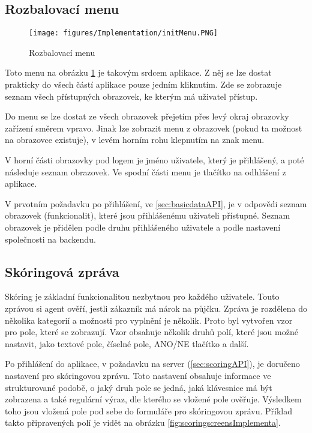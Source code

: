 \documentclass[11pt,twoside,a4paper]{book}
\begin{document}
\subsection{Rozbalovací menu} \label{sec:rolmenu}
\begin{figure}[hb]
\begin{center}
\texttt{[image: figures/Implementation/initMenu.PNG]}
\caption{Rozbalovací menu}
\label{fig:menuscreens}
\end{center}
\end{figure}

Toto menu na obrázku \ref{fig:menuscreens} je takovým srdcem aplikace. Z něj se lze dostat prakticky do všech částí aplikace pouze jedním kliknutím. Zde se zobrazuje seznam všech přístupných obrazovek, ke kterým má uživatel přístup. 

Do menu se lze dostat ze všech obrazovek přejetím přes levý okraj obrazovky zařízení směrem vpravo. Jinak lze zobrazit menu z obrazovek (pokud ta možnost na obrazovce existuje), v levém horním rohu klepnutím na znak menu. 

V horní části obrazovky pod logem je jméno uživatele, který je přihlášený, a poté následuje seznam obrazovek. Ve spodní části menu je tlačítko na odhlášení z aplikace.

V prvotním požadavku po přihlášení, ve \ref{sec:basicdataAPI}, je v odpovědi seznam obrazovek (funkcionalit), které jsou přihlášenému uživateli přístupné. Seznam obrazovek je přidělen podle druhu přihlášeného uživatele a podle nastavení společnosti na backendu.

\subsection{Skóringová zpráva} \label{sec:scoring}
Skóring je základní funkcionalitou nezbytnou pro každého uživatele. Touto zprávou si agent ověří, jestli zákazník má nárok na půjčku. Zpráva je rozdělena do několika kategorií a možnosti pro vyplnění je několik. Proto byl vytvořen vzor pro pole, které se zobrazují. Vzor obsahuje několik druhů polí, které jsou možné nastavit, jako textové pole, číselné pole, ANO/NE tlačítko a další. 

Po přihlášení do aplikace, v požadavku na server (\ref{sec:scoringAPI}), je doručeno nastavení pro skóringovou zprávu. Toto nastavení obsahuje informace ve strukturované podobě, o jaký druh pole se jedná, jaká klávesnice má být zobrazena a také regulární výraz, dle kterého se vložené pole ověřuje. Výsledkem toho jsou vložená pole pod sebe do formuláře pro skóringovou zprávu. Příklad takto připravených polí je vidět na obrázku \ref{fig:scoringscreensImplementa}. 
\end{document}
